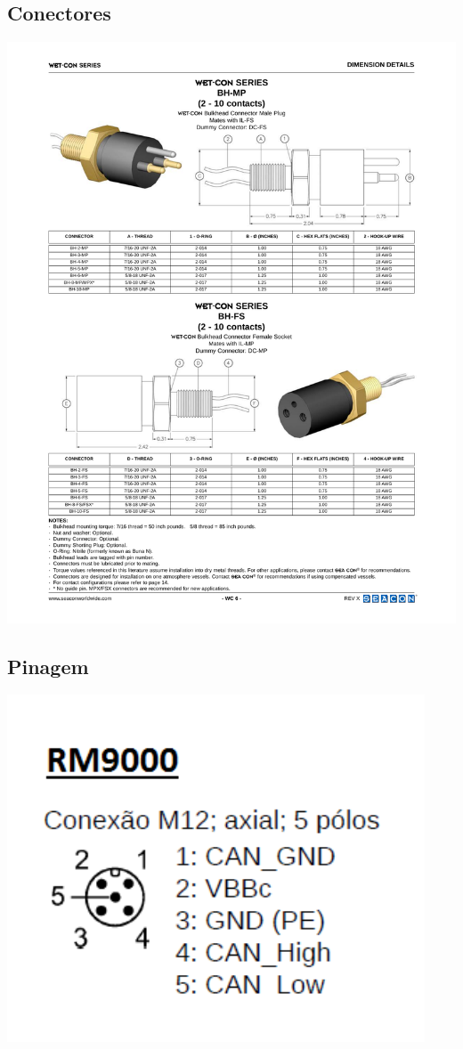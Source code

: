 \subsection{Conectores}
\includegraphics[width=.9\columnwidth]{figs/datasheets/WETCON.pdf}

\subsection{Pinagem}
\includegraphics[width=.9\columnwidth]{figs/datasheets/pinout.pdf}

% 

